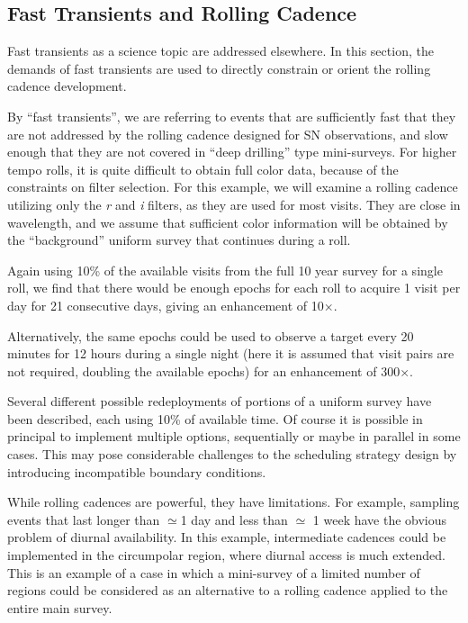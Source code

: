 
\subsection{Fast Transients and Rolling Cadence}
\label{sec:rolling:transients}

Fast transients as a science topic are addressed elsewhere. In this
section, the demands of fast transients are used to directly constrain
or orient the rolling cadence development.

By ``fast transients'', we are referring to events that are sufficiently
fast that they are not addressed by the rolling cadence designed for SN
observations, and slow enough that they are not covered in ``deep
drilling'' type mini-surveys.  For higher tempo rolls, it is quite
difficult to obtain full color data, because of the constraints on
filter selection.  For this example, we will examine a rolling cadence
utilizing only the {\it r} and {\it i} filters, as they are used for
most visits. They are close in wavelength, and we assume that sufficient
color information will be obtained by the ``background'' uniform survey
that continues during a roll.

Again using 10\% of the available visits from the full 10 year survey
for a single roll, we find that there would be enough epochs for each
roll to acquire 1 visit per day for 21 consecutive days, giving an
enhancement of 10$\times$.

Alternatively, the same epochs could be used to observe a target every
20 minutes for 12 hours during a single night (here it is assumed that
visit pairs are not required, doubling the available epochs) for an
enhancement of 300$\times$.

Several different possible redeployments of portions of a uniform survey
have been described, each using 10\% of available time.  Of course it is
possible in principal to implement multiple options, sequentially or
maybe in parallel in some cases. This may pose considerable challenges
to the scheduling strategy design by introducing incompatible boundary
conditions.

While rolling cadences are powerful, they have limitations.  For
example, sampling events that last longer than $\simeq$1 day and less
than $\simeq$ 1 week have the obvious problem of diurnal availability.
In this example, intermediate cadences could be implemented in the
circumpolar region, where diurnal access is much extended.  This is an
example of a case in which a mini-survey of a limited number of regions
could be considered as an alternative to a rolling cadence applied to
the entire main survey.

